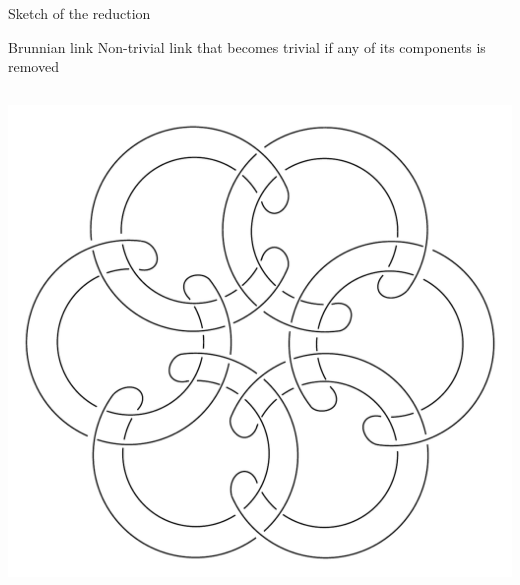 \documentclass[11pt,xcolor=dvipsnames,presentation]{beamer}
\begin{document}
\begin{frame}{Sketch of the reduction}
  \begin{block}{Brunnian link}
    Non-trivial link that becomes trivial if any of its components is removed
  \end{block}
  \begin{columns}
    \begin{column}{.47\linewidth}
      \centering
      \includegraphics[width=1\linewidth]{rubberband.pdf}
    \end{column}
    \hfill
  \end{columns}
\end{frame}
\end{document}
